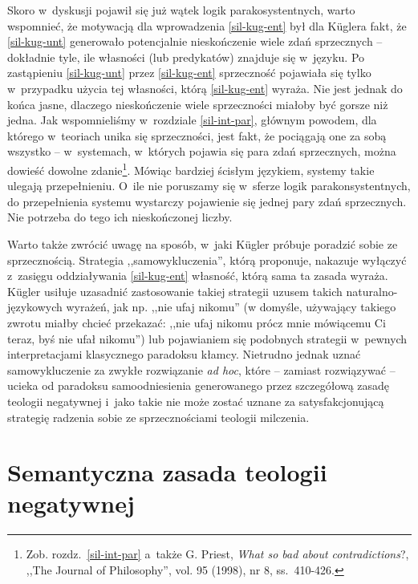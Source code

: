 Skoro w~dyskusji pojawił się już wątek logik parakosystentnych, warto wspomnieć, że motywacją dla wprowadzenia \ref{sil-kug-ent} był dla Küglera fakt, że \ref{sil-kug-unt} generowało potencjalnie nieskończenie wiele zdań sprzecznych -- dokładnie tyle, ile własności (lub predykatów) znajduje się w~języku. Po zastąpieniu \ref{sil-kug-unt} przez \ref{sil-kug-ent} sprzeczność pojawiała się tylko w~przypadku użycia tej własności, którą \ref{sil-kug-ent} wyraża. Nie jest jednak do końca jasne, dlaczego nieskończenie wiele sprzeczności miałoby być gorsze niż jedna. Jak wspomnieliśmy w~rozdziale \ref{sil-int-par}, głównym powodem, dla którego w~teoriach unika się sprzeczności, jest fakt, że pociągają one za sobą wszystko -- w~systemach, w~których pojawia się para zdań sprzecznych, można dowieść dowolne zdanie\footnote{Zob. rozdz.~\ref{sil-int-par} a~także G. Priest, \textit{What so bad about contradictions}?, ,,The Journal of Philosophy'', vol. 95 (1998), nr 8, ss.~410-426.}. Mówiąc bardziej ścisłym językiem, systemy takie ulegają przepełnieniu. O~ile nie poruszamy się w~sferze logik parakonsystentnych, do przepełnienia systemu wystarczy pojawienie się jednej pary zdań sprzecznych. Nie potrzeba do tego ich nieskończonej liczby.

Warto także zwrócić uwagę na sposób, w~jaki Kügler próbuje poradzić sobie ze sprzecznością. Strategia ,,samowykluczenia'', którą proponuje, nakazuje wyłączyć z~zasięgu oddziaływania \ref{sil-kug-ent} własność, którą sama ta zasada wyraża. Kügler usiłuje uzasadnić zastosowanie takiej strategii uzusem takich naturalno-językowych wyrażeń, jak np. ,,nie ufaj nikomu'' (w domyśle, używający takiego zwrotu miałby chcieć przekazać: ,,nie ufaj nikomu prócz mnie mówiącemu Ci teraz, byś nie ufał nikomu'') lub pojawianiem się podobnych strategii w~pewnych interpretacjami klasycznego paradoksu kłamcy. Nietrudno jednak uznać samowykluczenie za zwykłe rozwiązanie \textit{ad hoc}, które -- zamiast rozwiązywać -- ucieka od paradoksu samoodniesienia generowanego przez szczegółową zasadę teologii negatywnej i~jako takie nie może zostać uznane za satysfakcjonującą strategię radzenia sobie ze sprzecznościami teologii milczenia.


\chapter{Semantyczna zasada teologii negatywnej}\label{sil-gell}

